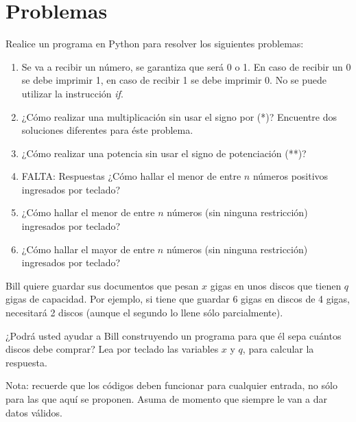 \section{Problemas}

\begin{Exercise}[title={Calentamiento}]
Realice un programa en Python para resolver los siguientes problemas:
\begin{enumerate}
\item Se va a recibir un número, se garantiza que será 0 o 1. En caso de recibir un 0 se debe imprimir 1, en caso de recibir 1 se debe imprimir 0. No se puede utilizar la instrucción \emph{if}.

\item ¿Cómo realizar una multiplicación sin usar el signo por (*)? Encuentre dos soluciones diferentes para éste problema.

\item ¿Cómo realizar una potencia sin usar el signo de potenciación (**)?

\item FALTA: Respuestas ¿Cómo hallar el menor de entre $n$ números positivos ingresados por teclado?

\item ¿Cómo hallar el menor de entre $n$ números (sin ninguna restricción)  ingresados por teclado?

\item ¿Cómo hallar el mayor de entre $n$ números (sin ninguna restricción)  ingresados por teclado?
\end{enumerate}
\end{Exercise}
\begin{Answer}


\end{Answer}

\begin{Exercise}[title={La Copia de Seguridad}]
Bill quiere guardar sus documentos que pesan $x$ gigas en unos discos que tienen $q$ gigas de capacidad. Por ejemplo, si tiene que guardar 6 gigas en discos de 4 gigas, necesitará 2 discos (aunque el segundo lo llene sólo parcialmente).

¿Podrá usted ayudar a Bill construyendo un programa para que él sepa cuántos discos debe comprar? Lea por teclado las variables $x$ y $q$, para calcular la respuesta.

Nota: recuerde que los códigos deben funcionar para cualquier entrada, no sólo para las que aquí se proponen. Asuma de momento que siempre le van a dar datos válidos.

\end{Exercise}


